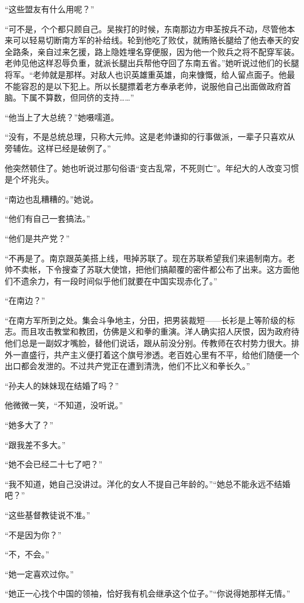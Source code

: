 \par “这些盟友有什么用呢？”
\par “可不是，个个都只顾自己。吴挨打的时候，东南那边方申荃按兵不动，尽管他本来可以轻易切断南方军的补给线。轮到他吃了败仗，就贿赂长腿给了他去奉天的安全路条，亲自过来乞援，路上隐姓埋名穿便服，因为他一个败兵之将不配穿军装。老帅见他这样忍辱负重，就派长腿出兵帮他夺回了东南五省。”她听说过他们的长腿将军。“老帅就是那样。对敌人也识英雄重英雄，向来慷慨，给人留点面子。他最不能容忍的是以下犯上。所以长腿摽着老方奉承老帅，说服他自己出面做政府首脑。下属不算数，但同侪的支持……”
\par “他当上了大总统？”她嗫嚅道。
\par “没有，不是总统总理，只称大元帅。这是老帅谦抑的行事做派，一辈子只喜欢从旁辅佐。这样已经是破例了。”
\par 他突然顿住了。她也听说过那句俗语“变古乱常，不死则亡”。年纪大的人改变习惯是个坏兆头。
\par “南边也乱糟糟的。”她说。
\par “他们有自己一套搞法。”
\par “他们是共产党？”
\par “不再是了。南京跟英美搭上线，甩掉苏联了。现在苏联希望我们来遏制南方。老帅不卖帐，下令搜查了苏联大使馆，把他们搞颠覆的密件都公布了出来。这方面他们不遗余力，有一段时间似乎他们就要在中国实现赤化了。”
\par “在南边？”
\par “在南方军所到之处。集会斗争地主，分田，把男装裁短——长衫是上等阶级的标志。而且攻击教堂和教团，仿佛是义和拳的重演。洋人确实招人厌恨，因为政府待他们总是一副奴才嘴脸，替他们说话，跟从前没分别。传教师在农村势力很大。排外一直盛行，共产主义便打着这个旗号渗透。老百姓心里有不平，给他们随便一个出口都会发泄的。不过共产党正在遭到清洗，他们不比义和拳长久。”
\par “孙夫人的妹妹现在结婚了吗？”
\par 他微微一笑，“不知道，没听说。”
\par “她多大了？”
\par “跟我差不多大。”
\par “她不会已经二十七了吧？”
\par “我不知道，她自己没讲过。洋化的女人不提自己年龄的。”“她总不能永远不结婚吧？”
\par “这些基督教徒说不准。”
\par “不是因为你？”
\par “不，不会。”
\par “她一定喜欢过你。”
\par “她正一心找个中国的领袖，恰好我有机会继承这个位子。”“你说得她那样无情。”
